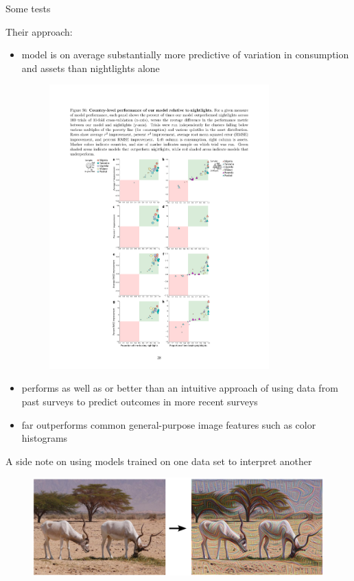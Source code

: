 \documentclass[mathserif]{beamer}
\begin{document}
\begin{frame}{Some tests}

Their approach:
\begin{itemize}
\item model is on average substantially more predictive of variation in consumption and assets than nightlights alone
\begin{figure}
\includegraphics[width=0.8\textwidth]{jean_figS6}
\end{figure}
\item performs as well as or better than an intuitive approach of using data from past surveys to predict outcomes in more recent surveys
\item far outperforms common general-purpose image features such as color histograms
\end{itemize}
\end{frame}

\begin{frame}{A side note on using models trained on one data set to interpret another}

\end{frame}

\begin{frame}{}
\begin{figure}
\includegraphics[width=\textwidth]{ibis_google}
\caption*{}
\end{figure}
\end{frame}
\end{document}
